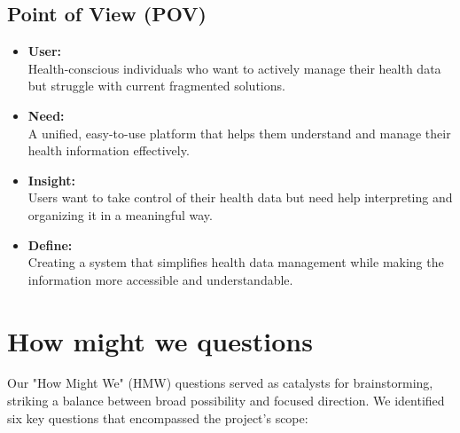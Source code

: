 \subsection{Point of View (POV)}
\begin{itemize}
    \item \textbf{User:}\\
    Health-conscious individuals who want to actively manage their health data but struggle with current fragmented solutions.

    \item \textbf{Need:}\\
    A unified, easy-to-use platform that helps them understand and manage their health information effectively.

    \item \textbf{Insight:}\\
    Users want to take control of their health data but need help interpreting and organizing it in a meaningful way.

    \item \textbf{Define:}\\
    Creating a system that simplifies health data management while making the information more accessible and understandable.
\end{itemize}

\section{How might we questions}

Our "How Might We" (HMW) questions served as catalysts for brainstorming, striking a balance between broad possibility and focused direction. We identified six key questions that encompassed the project's scope:

